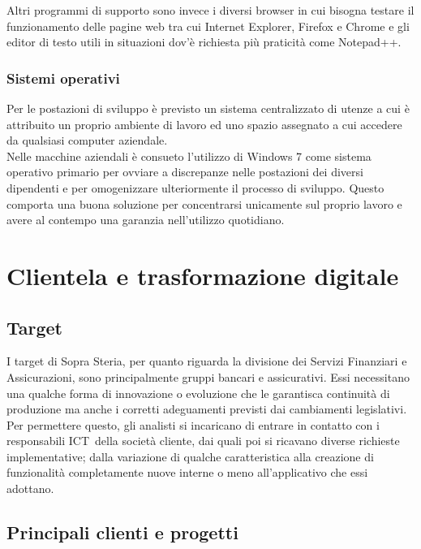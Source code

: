 	Altri programmi di supporto sono invece i diversi browser in cui bisogna testare il funzionamento delle pagine web tra cui Internet Explorer, Firefox e Chrome e gli editor di testo utili in situazioni dov'è richiesta più praticità come Notepad++.
	
	\subsubsection{Sistemi operativi}
	Per le postazioni di sviluppo è previsto un sistema centralizzato di utenze a cui è attribuito un proprio ambiente di lavoro ed uno spazio assegnato a cui accedere da qualsiasi computer aziendale.\\
	
	Nelle macchine aziendali è consueto l'utilizzo di Windows 7 come sistema operativo primario per ovviare a discrepanze nelle postazioni dei diversi dipendenti e per omogenizzare ulteriormente il processo di sviluppo. Questo comporta una buona soluzione per concentrarsi unicamente sul proprio lavoro e avere al contempo una garanzia nell'utilizzo quotidiano.
	
\section{Clientela e trasformazione digitale}

	\subsection{Target}
	
	I target di Sopra Steria, per quanto riguarda la divisione dei Servizi Finanziari e Assicurazioni, sono principalmente gruppi bancari e assicurativi. Essi necessitano una qualche forma di innovazione o evoluzione che le garantisca continuità di produzione ma anche i corretti adeguamenti previsti dai cambiamenti legislativi.\\
	
	 Per permettere questo, gli analisti si incaricano di entrare in contatto con i responsabili ICT\glossario\ della società cliente, dai quali poi si ricavano diverse richieste implementative; dalla variazione di	qualche caratteristica alla creazione di funzionalità completamente nuove interne o meno all'applicativo che essi adottano. 

	\subsection{Principali clienti e progetti}
	
